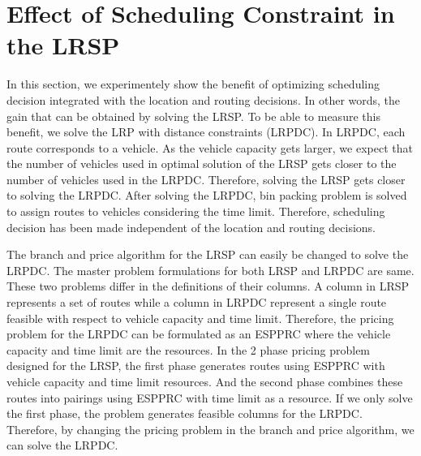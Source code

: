 \section{Effect of Scheduling Constraint in the LRSP}

In this section, we experimentely show the
benefit of optimizing scheduling decision integrated with
the location and routing decisions. In other words, the gain
that can be obtained by solving the LRSP. To be able to measure
this benefit, we solve the LRP with distance constraints (LRPDC). 
In LRPDC, each route corresponds to a vehicle. As the vehicle
capacity gets larger, we expect that the number 
of vehicles used in optimal solution of the LRSP gets closer to the
number of vehicles used in the LRPDC. Therefore, solving the LRSP
gets closer to  solving the LRPDC. 
After solving the LRPDC, bin packing problem 
is solved to assign routes to vehicles considering the time limit. 
Therefore, scheduling decision has been made independent of the location and 
routing decisions. 

The branch and price algorithm for the LRSP can easily be changed to 
solve the LRPDC. The master problem formulations for both LRSP and LRPDC
are same. These two problems differ in the definitions of their columns.   
A column in LRSP represents a set of routes while a column in 
LRPDC represent a single route feasible with respect to vehicle capacity and
time limit. Therefore, the pricing problem for the LRPDC can be formulated
as an ESPPRC where the vehicle capacity and time limit are the resources.
In the 2 phase pricing problem designed for the LRSP, the first phase 
generates routes using ESPPRC with vehicle capacity and time limit resources.
And the second phase combines these routes into pairings using ESPPRC
with time limit as a resource. If we only solve the 
first phase, the problem generates feasible columns for the LRPDC. 
Therefore, by changing the pricing problem in the branch and price algorithm,
we can solve the LRPDC. 

